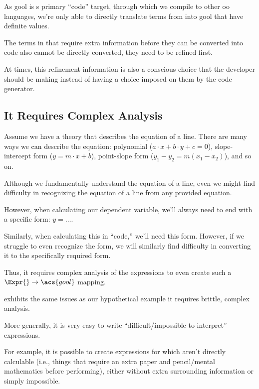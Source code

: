 As \acs{gool} is \Expr{}s primary ``code'' target, through which we compile to
other \acs{oo} languages, we're only able to directly translate terms from
\Expr{} into \acs{gool} that have definite values.

The terms in \Expr{} that require extra information before they can be converted
into code also cannot be directly converted, they need to be refined first.

At times, this refinement information is also a conscious choice that the
developer should be making instead of having a choice imposed on them by the
code generator.



\subsection{It Requires Complex Analysis}






Assume we have a theory that describes the equation of a line. There are many
ways we can describe the equation: polynomial (\(a \cdot{} x + b \cdot{} y + c =
0\)), slope-intercept form (\(y = m \cdot{} x + b\)), point-slope form (\(y_1 -
y_2 = m(x_1 - x_2)\)), and so on.

Although we fundamentally understand the equation of a line, even we might find
difficulty in recognizing the equation of a line from any provided equation.

However, when calculating our dependent variable, we'll always need to end with
a specific form: \(y = \ldots{}\).

Similarly, when calculating this in ``code,'' we'll need this form. However, if
we struggle to even recognize the form, we will similarly find difficulty in
converting it to the specifically required form.

Thus, it requires complex analysis of the expressions to even create such a
\(\Expr{} \rightarrow \acs{gool}\) mapping.

\RelationConcept{} exhibits the same issues as our hypothetical example
\textemdash{} it requires brittle, complex analysis.




More generally, it is very easy to write ``difficult/impossible to interpret''
expressions.

For example, it is possible to create expressions for which aren't directly
calculable (i.e., things that require an extra paper and pencil/mental
mathematics before performing), either without extra surrounding information or
simply impossible.




